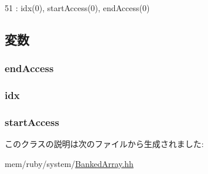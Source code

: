 \begin{DoxyCode}
51 : idx(0), startAccess(0), endAccess(0) {}
\end{DoxyCode}


\subsection{変数}
\hypertarget{classBankedArray_1_1AccessRecord_aa168738fc5b3f26027b295fb7693b895}{
\subsubsection[{endAccess}]{ {\bf endAccess}}}
\label{classBankedArray_1_1AccessRecord_aa168738fc5b3f26027b295fb7693b895}
\hypertarget{classBankedArray_1_1AccessRecord_a6f53eba8af00fbd74cde35b7c969c63b}{
\subsubsection[{idx}]{ {\bf idx}}}
\label{classBankedArray_1_1AccessRecord_a6f53eba8af00fbd74cde35b7c969c63b}
\hypertarget{classBankedArray_1_1AccessRecord_affa12ca1e67f52a12e4e229390e9fb95}{
\subsubsection[{startAccess}]{ {\bf startAccess}}}
\label{classBankedArray_1_1AccessRecord_affa12ca1e67f52a12e4e229390e9fb95}


このクラスの説明は次のファイルから生成されました:\begin{DoxyCompactItemize}
\item 
mem/ruby/system/\hyperlink{BankedArray_8hh}{BankedArray.hh}\end{DoxyCompactItemize}
